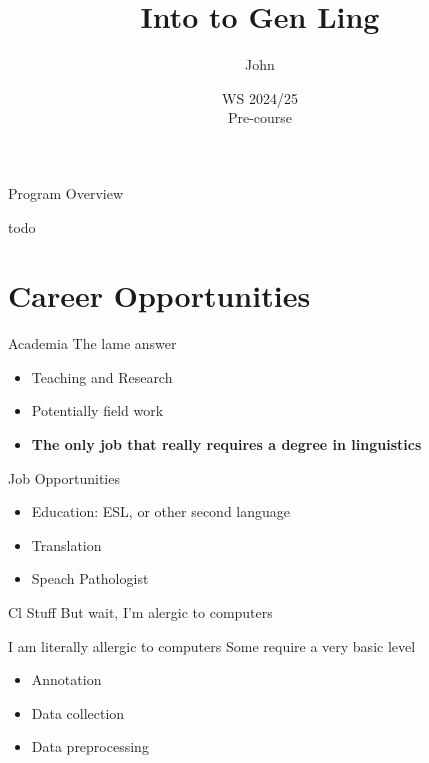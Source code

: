 \documentclass[aspectratio=169,hyperref={unicode}]{beamer}
\title{Into to Gen Ling}
\author{John}
\institute{Fachschaft General \& Computational Linguistics\\ \textbf{University of Tübingen}}
\date{WS 2024/25 \\ Pre-course}
\begin{document}
\frame{\titlepage}

\begin{frame}{Program Overview}

todo
\end{frame}

\section{Career Opportunities}


\begin{frame}{Academia}
The lame answer
  \begin{itemize}
    \item Teaching and Research
	\item Potentially field work 
    \item \textbf{The only job that really requires a degree in linguistics}

  \end{itemize}
\end{frame}

\begin{frame}{Job Opportunities}
  \begin{itemize}
    \item Education: ESL, or other second language
    \item Translation
    \item Speach Pathologist
  \end{itemize}
\end{frame}


\begin{frame}{Cl Stuff}
But wait, I'm alergic to computers
\end{frame}

\begin{frame}{I am literally allergic to computers}
Some require a very basic level
  \begin{itemize}
    \item Annotation
    \item Data collection
    \item Data preprocessing
  \end{itemize}


\end{frame}
\end{document}
